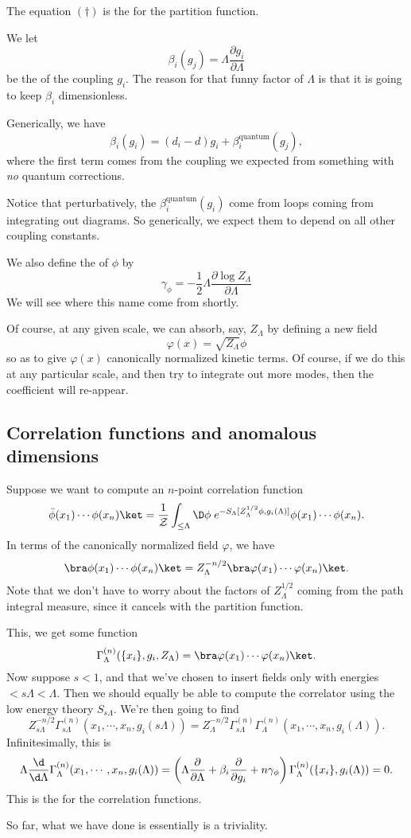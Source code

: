 \documentclass[a4paper]{article}
\begin{document}
The equation $(\dagger)$ is the  for the partition function.

We let
\[
  \beta_i (g_j) = \Lambda \frac{\partial g_i}{\partial \Lambda}
\]
be the  of the coupling $g_i$. The reason for that funny factor of $\Lambda$ is that it is going to keep $\beta_i$ dimensionless. %

Generically, we have
\[
  \beta_i(g_i) = (d_i - d) g_i + \beta_i^{\mathrm{quantum}} (g_j),
\]
where the first term comes from the coupling we expected from something with \emph{no} quantum corrections.

Notice that perturbatively, the $\beta_i^{\mathrm{quantum}} (g_i)$ come from loops coming from integrating out diagrams. So generically, we expect them to depend on all other coupling constants.

We also define the  of $\phi$ by
\[
  \gamma_\phi = - \frac{1}{2} \Lambda \frac{\partial \log Z_\Lambda}{\partial \Lambda}
\]
We will see where this name come from shortly.

Of course, at any given scale, we can absorb, say, $Z_\Lambda$ by defining a new field
\[
  \varphi(x) = \sqrt{Z_\Lambda} \phi
\]
so as to give $\varphi(x)$ canonically normalized kinetic terms. Of course, if we do this at any particular scale, and then try to integrate out more modes, then the coefficient will re-appear.

\subsection{Correlation functions and anomalous dimensions}
Suppose we want to compute an $n$-point correlation function
\[
  \bar \phi(x_1) \cdots \phi(x_n)\ket = \frac{1}{\mathcal{Z}} \int_{\leq \Lambda} \D \phi\; e^{-S_\Lambda[Z_\Lambda^{1/2} \phi, g_i(\Lambda)]} \phi(x_1) \cdots \phi(x_n).
\]
In terms of the canonically normalized field $\varphi$, we have
\[
  \bra \phi(x_1) \cdots \phi(x_n)\ket = Z_\Lambda^{-n/2} \bra \varphi(x_1) \cdots \varphi(x_n)\ket.
\]
Note that we don't have to worry about the factors of $Z_\Lambda^{1/2}$ coming from the path integral measure, since it cancels with the partition function.

This, we get some function
\[
  \Gamma_\Lambda^{(n)} (\{x_i\}, g_i, Z_\Lambda) = \bra \varphi(x_1) \cdots \varphi(x_n)\ket.
\]
Now suppose $s < 1$, and that we've chosen to insert fields only with energies $< s \Lambda < \Lambda$. Then we should equally be able to compute the correlator using the low energy theory $S_{s\Lambda}$. We're then going to find
\[
  Z^{-n/2}_{s\Lambda} \Gamma_{s\Lambda}^{(n)} (x_1, \cdots, x_n, g_i(s\Lambda)) = Z_\Lambda^{-n/2} \Gamma^{(n)}_{s\Lambda} \Gamma_\Lambda^{(n)} (x_1, \cdots, x_n, g_i(\Lambda)).
\]
Infinitesimally, this is
\[
  \Lambda \frac{\d}{\d \Lambda} \Gamma_\Lambda^{(n)}(x_1, \cdots, x_n, g_i(\Lambda)) = \left(\Lambda \frac{\partial}{\partial \Lambda} + \beta_i \frac{\partial}{\partial g_i} + n \gamma_\phi\right) \Gamma_\Lambda^{(n)} ( \{x_i\}, g_i(\Lambda)) = 0.
\]
This is the  for the correlation functions.

So far, what we have done is essentially is a triviality.
\printindex
\end{document}
